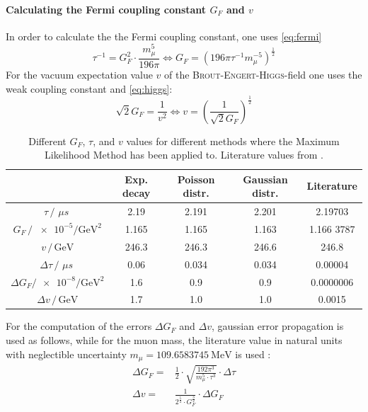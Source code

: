\documentclass[english,  %
parskip=full,   %
headsepline]{scrartcl}
\newcommand{\mus}{\,\si{\mu s\:}}
\begin{document}
\paragraph{Calculating the Fermi coupling constant $G_F$ and $v$}
In order to calculate the the Fermi coupling constant, one uses \cref{eq:fermi}
\begin{equation}
    \tau^{-1} = G_F^2\cdot \frac{m_{\mu}^5}{196\pi} \Longleftrightarrow G_F = \left(196\pi \tau^{-1}m_{\mu}^{-5} \right)^{\frac{1}{2}}
\end{equation}
For the vacuum expectation value $v$ of the \textsc{Brout-Engert-Higgs}-field one uses the weak coupling constant \cite{anleitung} and \cref{eq:higgs}:
\begin{equation}
    \sqrt{2}G_F=\frac{1}{v^2} \Longleftrightarrow v=\left ( \frac{1}{\sqrt{2}G_F}\right)^{\frac{1}{2}}
\end{equation}
\begin{table}[!htp]
    \centering
        \caption{Different $G_F$, $\tau$, and $v$ values for different methods where the Maximum Likelihood Method has been applied to. Literature values from \cite{literatur}\cite{Zyla:2020zbs}\cite{higgs}.}
    \begin{tabular}{c||c|c|c|c}
         &\textbf{Exp. decay}&\textbf{Poisson distr.}&\textbf{Gaussian distr.} &\textbf{Literature}\\\hline \hline
         $\tau \,/\, \mus$&2.19&2.191&2.201&2.19703\\ \hline
         $G_F \,/ \, \num{e-5}\si{\per\giga\eV\squared}$&1.165& 1.165& 1.163&1.166 3787\\ \hline
         $v \,/ \, \si{\giga \eV}$&246.3&246.3&246.6&246.8\\ \hline
         $\Delta \tau \,/\, \mus$&0.06&0.034&0.034&0.00004 \\ \hline
         $\Delta G_F / \num{e-8}\si{\per\giga\eV\squared}$&1.6& 0.9 &0.9&0.0000006 \\ \hline
         $\Delta v \,/ \, \si{\giga \eV}$&1.7& 1.0 & 1.0&0.0015
    \end{tabular}
    \label{tab:results}
\end{table}
For the computation of the errors $\Delta G_F$ and $\Delta v$, gaussian error propagation is used as follows, while for the muon mass, the literature value in natural units with neglectible uncertainty $m_{\mu}=\SI{109.6583745}{\mega \eV}$ is used \cite{literatur}:
\begin{align}
    \Delta G_F =& \frac{1}{2}\cdot \sqrt{\frac{192\pi^3}{m_{\mu}^5\cdot \tau^3}} \cdot \Delta \tau \\
    \Delta v =& \frac{1}{2^{\frac{5}{4}}\cdot G_F^{\frac{3}{2}}} \cdot \Delta G_F
\end{align}
\end{document}
